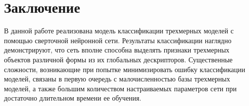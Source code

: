 \documentclass[14pt]{article}
\numberwithin{figure}{section}
\numberwithin{equation}{section}
\begin{document}

\newpage
{}
\section*{Заключение}

В данной работе реализована модель классификации трехмерных моделей с помощью сверточной нейронной сети. Результаты классификации наглядно демонстрируют, что сеть вполне способна выделять признаки трехмерных объектов различной формы из их глобальных дескрипторов. Существенные сложности, возникающие при попытке минимизировать ошибку классификации моделей, связаны в первую очередь с малочисленностью базы трехмерных моделей, а также большим количеством настраиваемых параметров сети при достаточно длительном времени ее обучения.
\end{document}
